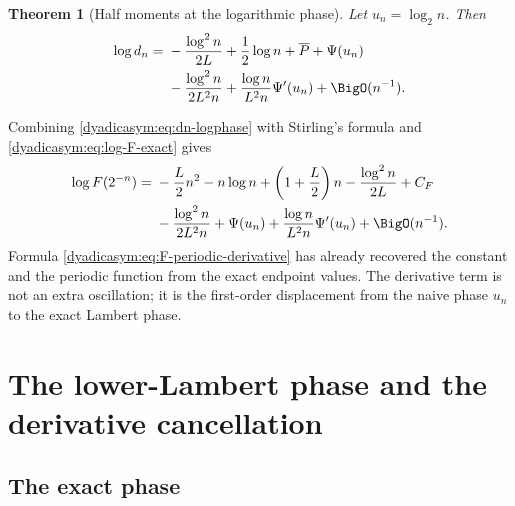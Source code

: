 \documentclass[11pt,oneside]{article}
\newtheorem{theorem}{Theorem}[section]
\theoremstyle{definition}
\theoremstyle{remark}
\begin{document}
\begin{theorem}[Half moments at the logarithmic phase]
\label{dyadicasym:thm:dn-logphase}
Let $u_n=\log_2n$.  Then
\begin{align}
 \log d_n={}&-\frac{\log^2n}{2L}+\frac12\log n
 +\overline P+\Psi(u_n)                                    \notag\\
 &-\frac{\log^2n}{2L^2n}
 +\frac{\log n}{L^2n}\Psi'(u_n)+\BigO(n^{-1}).             \label{dyadicasym:eq:dn-logphase}
\end{align}
\end{theorem}

Combining \eqref{dyadicasym:eq:dn-logphase} with Stirling's formula and
\eqref{dyadicasym:eq:log-F-exact} gives
\begin{align}
 \log F(2^{-n})={}&-\frac L2n^2-n\log n+
 \left(1+\frac L2\right)n-\frac{\log^2n}{2L}+C_F           \notag\\
 &-\frac{\log^2n}{2L^2n}+\Psi(u_n)
 +\frac{\log n}{L^2n}\Psi'(u_n)+\BigO(n^{-1}).             \label{dyadicasym:eq:F-periodic-derivative}
\end{align}
Formula \eqref{dyadicasym:eq:F-periodic-derivative} has already recovered the constant and the periodic
function from the exact endpoint values.  The derivative term is not an extra oscillation; it
is the first-order displacement from the naive phase $u_n$ to the exact Lambert phase.

\section{The lower-Lambert phase and the derivative cancellation}
\label{dyadicasym:sec:lambert-phase}

\subsection{The exact phase}
\end{document}
